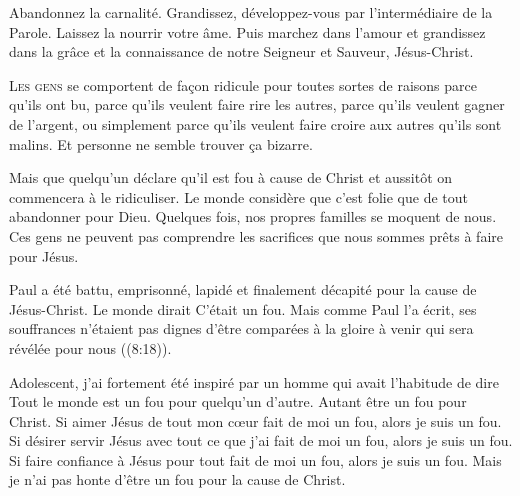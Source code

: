 Abandonnez la carnalité. Grandissez, développez-vous
 par l'intermédiaire de la Parole. Laissez la nourrir votre âme.
 Puis marchez dans l'amour et grandissez dans la
 grâce et la connaissance de notre Seigneur et Sauveur, Jésus-Christ.

\dvrule





\lettrine{L}{es gens} se comportent de fa\c{c}on ridicule
 pour toutes sortes de raisons \ocadr parce qu'ils ont bu,
 parce qu'ils veulent faire rire les autres,
 parce qu'ils veulent gagner de l'argent,
 ou simplement parce qu'ils veulent faire croire aux autres qu'ils sont malins.
 Et personne ne semble trouver \c{c}a bizarre.

Mais que quelqu'un déclare qu'il est fou à cause de Christ
 et aussitôt on commencera à le ridiculiser.
 Le monde considère que c'est folie que de tout abandonner pour Dieu.
 Quelques fois, nos propres familles se moquent de nous.
 Ces gens ne peuvent pas comprendre les sacrifices
 que nous sommes prêts à faire pour Jésus.

Paul a été battu, emprisonné, lapidé et finalement décapité
 pour la cause de Jésus-Christ. Le monde dirait\frcolon{} 
 \Og C'était un fou. \Fg{}
 Mais comme Paul l'a écrit, ses souffrances n'étaient pas
 \Og dignes d'être comparées à la gloire à venir
 qui sera révélée pour nous \Fg{}\linebreak ((8:18)).


Adolescent, j'ai fortement été inspiré par un homme
 qui avait l'habitude de dire\frcolon{} 
 \Og Tout le monde est un fou pour quelqu'un d'autre.
 Autant être un fou pour Christ. \Fg{}
 Si aimer Jésus de tout mon c\oe{}ur fait de moi un fou,
 alors je suis un fou. Si désirer servir Jésus avec tout ce que j'ai
 fait de moi un fou, alors je suis un fou.
 Si faire confiance à Jésus pour tout fait de moi un fou,
 alors je suis un fou.
 Mais je n'ai pas honte d'être un fou pour la cause de Christ.

